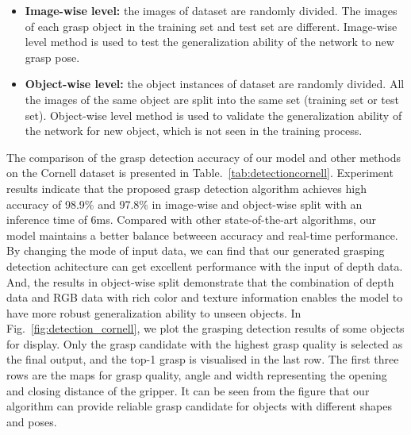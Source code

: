 \documentclass[journal]{IEEEtran}
\begin{document}
\begin{itemize}
	
	\item \textbf{Image-wise level:} the images of dataset are randomly divided. The images of each grasp object in the training set and test set are different. Image-wise level method is used to test the generalization ability of the network to new grasp pose.
	
	\item \textbf{Object-wise level:}  the object instances of dataset are randomly divided. All the images of the same object are split into the same set (training set or test set). Object-wise level method is used to validate the generalization ability of the network for new object, which is not seen in the training process.
	
\end{itemize}



The comparison of the grasp detection accuracy of our model and other methods on the Cornell dataset is presented in Table.~\ref{tab:detectioncornell}. Experiment results indicate that the proposed grasp detection algorithm achieves high accuracy of 98.9$\%$ and 97.8$\%$ in image-wise and object-wise split with an inference time of 6ms. Compared with other state-of-the-art algorithms, our model maintains a better balance betweeen accuracy and real-time performance. By changing the mode of input data, we can find that our generated grasping detection achitecture can get excellent performance with the input of depth data. And, the results in object-wise split demonstrate that the combination of depth data and RGB data with rich color and texture information enables the model to have more robust generalization ability to unseen objects.
In Fig.~\ref{fig:detection_cornell}, we plot the grasping detection results of some objects for display. Only the grasp candidate with the highest grasp quality is selected as the final output, and the top-1 grasp is visualised in the last row. The first three rows are the maps for grasp quality, angle and width representing the opening and closing distance of the gripper. It can be seen from the figure that our algorithm can provide reliable grasp candidate for objects with different shapes and poses.
\end{document}
